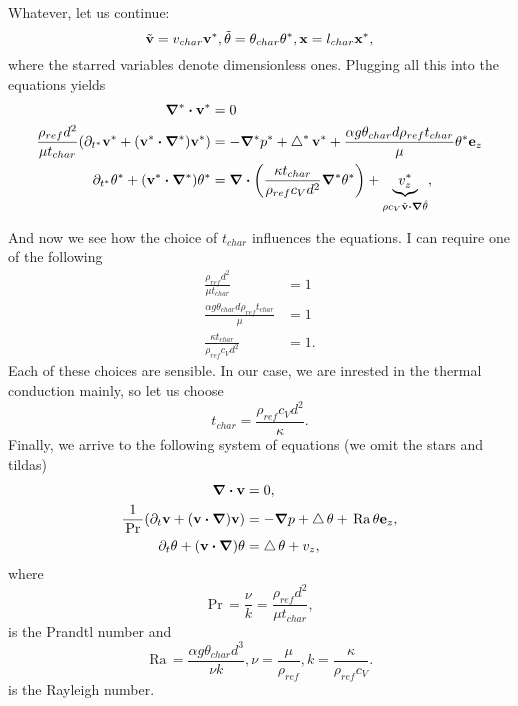 \documentclass[reqno, a4paper]{article}
\begin{document}
Whatever, let us continue:
\[
	\tilde{\vb{v}} = v_{char}\vb{v}^{*}, \tilde{\theta} = \theta_{char}\theta^{*}, \vb{x} = l_{char}\vb{x}^{*},
\]
where the starred variables denote dimensionless ones. Plugging all this into the equations yields
\begin{align*}
		\grad^{*} \vdot \vb{v}^{*} &= 0 \\
		\frac{\rho_{ref}d^{2}}{\mu t_{char}}\qty(\partial_{t^{*}} \vb{v}^{*} + \qty(\vb{v}^{*} \vdot \grad^{*})\vb{v}^{*}) &= - \grad^{*} p^{*} + \laplace^{*} \vb{v}^{*} + \frac{\alpha g \theta_{char}d \rho_{ref} t_{char}}{\mu}\theta^{*} \vb{e}_z\\
		\partial_{t^{*}}\theta^{*} + \qty(\vb{v}^{*} \vdot \grad^{*})\theta^{*}&= \divergence{\qty(\frac{\kappa t_{char}}{\rho_{ref}c_V d^{2}}\grad^{*} \theta^{*})}+ \underbrace{v^{*}_z}_{\rho c_V \tilde{\vb{v}}\vdot \grad \hat{\theta}}, 
\end{align*}

And now we see how the choice of $t_{char}$ influences the equations. I can require one of the following
\begin{align*}
		\frac{\rho_{ref}d^{2}}{\mu t_{char}} &= 1\\
		\frac{\alpha g \theta_{char}d \rho_{ref}t_{char}}{\mu} &= 1\\
		\frac{\kappa t_{char}}{\rho_{ref}c_Vd^{2}} &=1
	.
\end{align*}
Each of these choices are sensible. In our case, we are inrested in the thermal conduction mainly, so let us choose
\[
	t_{char} = \frac{\rho_{ref}c_V d^{2}}{\kappa}.
\]
Finally, we arrive to the following system of equations (we omit the stars and tildas)
\begin{align*}
	\divergence{\vb{v}} &= 0, \\
	\frac{1}{\, \text{Pr} \,}\qty(\partial_t \vb{v}+\qty(\vb{v} \vdot \grad)\vb{v}) &= - \grad p + \laplace \theta + \, \text{Ra} \,\theta \vb{e}_z, \\
	\partial_t \theta + \qty(\vb{v} \vdot \grad)\theta &=  \laplace \theta + v_z,
\end{align*}
where
\begin{equation}
\label{eq:prandtl_number}
	\, \text{Pr} \, = \frac{\nu}{k} = \frac{\rho_{ref} d^{2}}{\mu t_{char}},
\end{equation}
is the Prandtl number and
\begin{equation}
\label{eq:rayleigh_number}
	\, \text{Ra} \, = \frac{\alpha g \theta_{char}d^{3}}{\nu k}, \nu = \frac{\mu}{\rho_{ref}}, k = \frac{\kappa}{\rho_{ref}c_V}.
\end{equation}
is the Rayleigh number.
\end{document}

